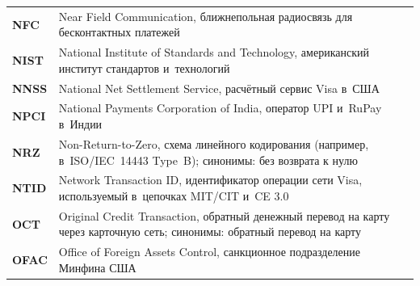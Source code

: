 \begin{longtable}{@{}p{4.5em}p{\dimexpr\linewidth-4.5em-2\tabcolsep\relax}@{}}
  \textbf{NFC}               & Near Field Communication, ближнепольная радиосвязь для бесконтактных платежей                                                                                                                                                                                                                    \\
  \textbf{NIST}              & National Institute of Standards and Technology, американский институт стандартов и~технологий                                                                                                                                                                                                    \\
  \textbf{NNSS}              & National Net Settlement Service, расчётный сервис Visa в~США                                                                                                                                                                                                                                     \\
  \textbf{NPCI}              & National Payments Corporation of India, оператор UPI и~RuPay в~Индии                                                                                                                                                                                                                             \\
  \textbf{NRZ}               & Non-Return-to-Zero, схема линейного кодирования (например, в~ISO/IEC~14443 Type~B); синонимы: без возврата к нулю                                                                                                                                                                                 \\
  \textbf{NTID}              & Network Transaction ID, идентификатор операции сети Visa, используемый в~цепочках MIT/CIT и~CE 3.0                                                                                                                                                                                               \\
  \textbf{OCT}               & Original Credit Transaction, обратный денежный перевод на карту через карточную сеть; синонимы: обратный перевод на карту                                                                                                                                                                        \\
  \textbf{OFAC}              & Office of Foreign Assets Control, санкционное подразделение Минфина США                                                                                                                                                                                                                          \\

\end{longtable}
